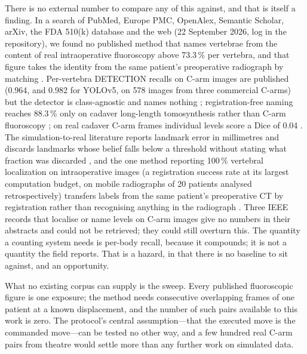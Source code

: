 \documentclass[11pt,letterpaper]{article}
\begin{document}
There is no external number to compare any of this against, and that is itself a finding. In a search of PubMed, Europe PMC, OpenAlex, Semantic Scholar, arXiv, the FDA 510(k) database and the web
(22 September 2026, log in the repository), we found no published method that names vertebrae from the content of
real intraoperative fluoroscopy above 73.3\,\% per vertebra, and that figure takes the identity from the same
patient's preoperative radiograph by matching \citep{zhang2023vdvm}. Per-vertebra DETECTION recalls on C-arm
images are published (0.964, and 0.982 for YOLOv5, on 578 images from three commercial C-arms) but the detector
is class-agnostic and names nothing \citep{rao2024}; registration-free naming reaches 88.3\,\% only on cadaver
long-length tomosynthesis rather than C-arm fluoroscopy \citep{huang2022}; on real cadaver C-arm frames individual
levels score a Dice of 0.04 \citep{killeen2025}. The simulation-to-real literature reports landmark error in
millimetres and discards landmarks whose belief falls below a threshold without stating what fraction was
discarded \citep{bier2019}, and the one method reporting 100\,\% vertebral localization on intraoperative images
(a registration success rate at its largest computation budget, on mobile radiographs of 20 patients analysed
retrospectively) transfers labels from the same patient's preoperative CT by registration rather than recognising
anything in the radiograph \citep{levelcheck2016}. Three IEEE records that localise or name levels on C-arm images
give no numbers in their abstracts and could not be retrieved; they could still overturn this. The quantity a counting system needs is per-body recall, because it compounds;
it is not a quantity the field reports. That is a hazard, in that there is no baseline to sit against,
and an opportunity.

What no existing corpus can supply is the sweep. Every published fluoroscopic figure is one exposure;
the method needs consecutive overlapping frames of one patient at a known displacement, and the number
of such pairs available to this work is zero. The protocol's central assumption---that the executed move
is the commanded move---can be tested no other way, and a few hundred real C-arm pairs from theatre
would settle more than any further work on simulated data.
\end{document}
